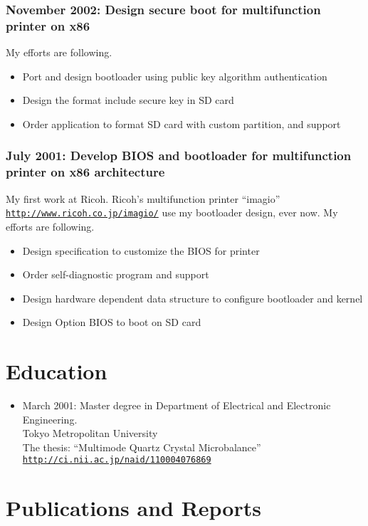 \documentclass[letterpaper]{article}
\begin{document}
\subsubsection*{November 2002: Design secure boot for multifunction printer on x86}
My efforts are following.
\begin{itemize}
  \item Port and design bootloader using public key algorithm authentication
  \item Design the format include secure key in SD card
  \item Order application to format SD card with custom partition, and support
\end{itemize}

\subsubsection*{July 2001: Develop BIOS and bootloader for multifunction printer on x86 architecture}
My first work at Ricoh.
Ricoh's multifunction printer ``imagio'' \href{http://www.ricoh.co.jp/imagio/}{\tt http://www.ricoh.co.jp/imagio/} use my bootloader design, ever now.
My efforts are following.
\begin{itemize}
  \item Design specification to customize the BIOS for printer
  \item Order self-diagnostic program and support
  \item Design hardware dependent data structure to configure bootloader and kernel
  \item Design Option BIOS to boot on SD card
\end{itemize}

\section*{Education}

\begin{itemize}
  \item March 2001: Master degree in Department of Electrical and Electronic Engineering. \\
    Tokyo Metropolitan University \\
    The thesis: ``Multimode Quartz Crystal Microbalance'' \\
    \href{http://ci.nii.ac.jp/naid/110004076869}{\tt http://ci.nii.ac.jp/naid/110004076869}
\end{itemize}

\section*{Publications and Reports}
\end{document}
